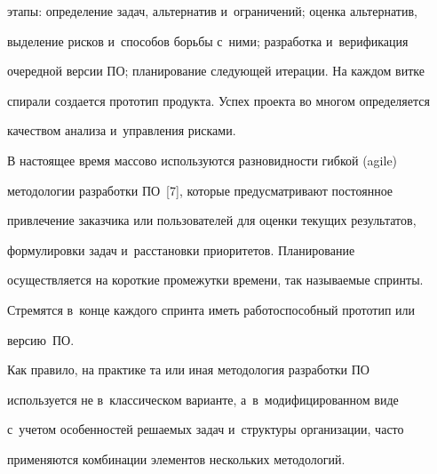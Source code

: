 этапы: определение задач, альтернатив и~ограничений; оцен\-ка альтернатив, 


выделение рис\-ков и~способов борьбы с~ними; разработка и~верификация 


очередной версии ПО; планирование сле\-ду\-ющей итерации. На каж\-дом витке 


спирали создается прототип продукта. Успех проекта во многом определяется 


качеством анализа и~управ\-ле\-ния рисками. 


  


  В настоящее время массово используются разновидности гибкой (agile) 


методологии разработки ПО~[7], которые предусмат\-ри\-ва\-ют по\-сто\-ян\-ное 


при\-вле\-че\-ние заказчика или пользователей для оцен\-ки текущих результатов, 


формулировки задач и~рас\-ста\-нов\-ки приоритетов. Планирование 


осуществляется на короткие промежутки времени, так на\-зы\-ва\-емые сприн\-ты. 


Стремятся в~конце каж\-до\-го сприн\-та иметь ра\-бо\-то\-спо\-соб\-ный прототип или 


вер\-сию~ПО. 


  


  Как правило, на практике та или иная методология разработки ПО 


используется не в~классическом варианте, а~в~модифицированном виде 


с~учетом особенностей ре\-ша\-емых задач и~структуры организации, час\-то 


применяются комбинации элементов нескольких методологий.





